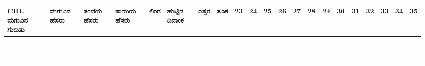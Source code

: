 ﻿\documentclass[12pt]{article}
\newcommand{\kn}[1]{%
{\fontspec[Script=Kannada]{Kedage}%
#1
}}
\begin{document}
\begin{tabular}{|p{2cm}|p{3cm}|p{2.8cm}|p{2.8cm}|p{1cm}|p{1cm}|l|l|l|l|l|l|l|l|l|l|l|l|l|l|l|}
CID-\kn{ಮಗುವಿನ ಗುರುತು} & \kn{ಮಗುವಿನ ಹೆಸರು} & \kn{ತಂದೆಯ ಹೆಸರು} & \kn{ತಾಯಿಯ ಹೆಸರು} & \kn{ಲಿಂಗ} & \kn{ಹುಟ್ಟಿದ ದಿನಾಂಕ} & \kn{ಎತ್ತರ} & \kn{ತೂಕ} & 23 & 24 & 25 & 26 & 27 & 28 & 29 & 30 & 31 & 32 & 33 & 34 & 35 \\ \hline
& & & & & & & &  & & & & & & & & & & & & \\ \hline
& & & & & & & &  & & & & & & & & & & & & \\ \hline
& & & & & & & &  & & & & & & & & & & & & \\ \hline
& & & & & & & &  & & & & & & & & & & & & \\ \hline
& & & & & & & &  & & & & & & & & & & & & \\ \hline
& & & & & & & &  & & & & & & & & & & & & \\ \hline
& & & & & & & &  & & & & & & & & & & & & \\ \hline
& & & & & & & &  & & & & & & & & & & & & \\ \hline
& & & & & & & &  & & & & & & & & & & & & \\ \hline
& & & & & & & &  & & & & & & & & & & & & \\ \hline

\end{tabular}

\pagebreak

\end{document}

